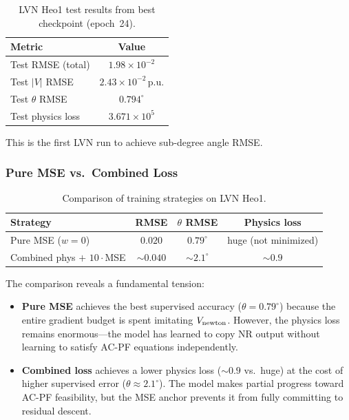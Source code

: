 \documentclass{article}
\begin{document}
\begin{table}[h]
\centering
\caption{LVN Heo1 test results from best checkpoint (epoch~24).}
\label{tab:heo1_test}
\begin{tabular}{lc}
\toprule
Metric & Value \\
\midrule
Test RMSE (total)    & $1.98\times10^{-2}$ \\
Test $|V|$ RMSE      & $2.43\times10^{-2}$\,p.u. \\
Test $\theta$ RMSE   & $0.794^\circ$ \\
Test physics loss    & $3.671\times10^{5}$ \\
\bottomrule
\end{tabular}
\end{table}

This is the first LVN run to achieve sub-degree angle RMSE.

\subsubsection{Pure MSE vs.\ Combined Loss}

\begin{table}[h]
\centering
\caption{Comparison of training strategies on LVN Heo1.}
\label{tab:heo1_compare}
\begin{tabular}{lccc}
\toprule
Strategy & RMSE & $\theta$ RMSE & Physics loss \\
\midrule
Pure MSE ($w=0$)           & $0.020$ & $0.79^\circ$ & huge (not minimized) \\
Combined phys $+$ $10\cdot$MSE & ${\sim}0.040$ & ${\sim}2.1^\circ$ & ${\sim}0.9$ \\
\bottomrule
\end{tabular}
\end{table}

The comparison reveals a fundamental tension:

\begin{itemize}[noitemsep]
  \item \textbf{Pure MSE} achieves the best supervised accuracy ($\theta =
    0.79^\circ$) because the entire gradient budget is spent imitating
    $V_{\rm newton}$.  However, the physics loss remains enormous---the
    model has learned to copy NR output without learning to satisfy AC-PF
    equations independently.

  \item \textbf{Combined loss} achieves a lower physics loss (${\sim}0.9$
    vs.\ huge) at the cost of higher supervised error ($\theta \approx
    2.1^\circ$).  The model makes partial progress toward AC-PF
    feasibility, but the MSE anchor prevents it from fully committing to
    residual descent.
\end{itemize}
\end{document}
